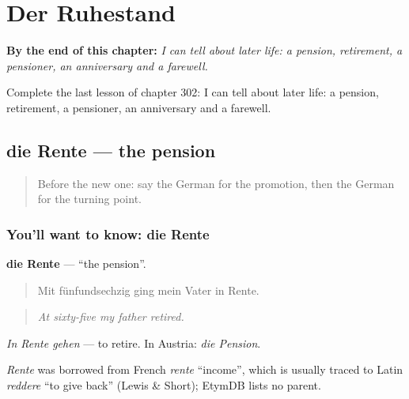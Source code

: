 
\chapter{Der Ruhestand}
\label{ch:ge-der-ruhestand}

\begin{chapteropening}
\textbf{By the end of this chapter:} \emph{I can tell about later life: a pension, retirement, a pensioner, an anniversary and a farewell.}

Complete the last lesson of chapter 302: I can tell about later life: a pension, retirement, a pensioner, an anniversary and a farewell.
\end{chapteropening}

\section[die Rente]{die Rente — the pension}

\label{lesson:GE-C302-rente}



\begin{quote}
Before the new one: say the German for the promotion, then the German for the turning point.
\end{quote}

\subsection*{You'll want to know: die Rente}
\textbf{die Rente} — \textquotedblleft{}the pension\textquotedblright{}.

\begin{quote}
Mit fünfundsechzig ging mein Vater in Rente.
\end{quote}

\begin{quote}
\emph{At sixty-five my father retired.}
\end{quote}

\emph{In Rente gehen} — to retire. In Austria: \emph{die Pension}.

\begin{cousinweb}
\emph{Rente} was borrowed from French \emph{rente} \textquotedblleft{}income\textquotedblright{}, which is usually traced to Latin \emph{reddere} \textquotedblleft{}to give back\textquotedblright{} (Lewis \& Short); EtymDB lists no parent.
\end{cousinweb}

